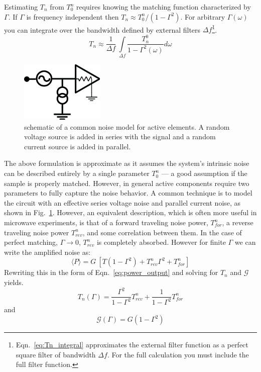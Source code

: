 Estimating $T_n$ from $T_0^n$ requires knowing the matching function characterized by $\Gamma$. If $\Gamma$ is frequency independent then $T_n \approx T_0^n / (1-\Gamma^2)$. For arbitrary $\Gamma(\omega)$ you can integrate over the bandwidth defined by external filters $\Delta f$\footnote{Eqn.~\ref{eq:Tn_integral} approximates the external filter function as a perfect square filter of bandwidth $\Delta f$. For the full calculation you must include the full filter function.}.
\begin{equation}\label{eq:Tn_integral}
T_n \approx \frac{1}{\Delta f}\ \int\limits_{\Delta f}\frac{T_n^0}{1-\Gamma^2(\omega)}d\omega
\end{equation}
\begin{figure}
\centering
\includegraphics[width=40mm]{figures/Johnson_noise_thermometry/schematic_noise_IV.png}
\caption{schematic of a common noise model for active elements. A random voltage source is added in series with the signal and a random current source is added in parallel.}
\label{fig:schematic_noise_IV}
\end{figure}

The above formulation is approximate as it assumes the system's intrinsic noise can be described entirely by a single parameter $T_0^n$ --- a good assumption if the sample is properly matched. However, in general active components require two parameters to fully capture the noise behavior. A common technique is to model the circuit with an effective series voltage noise and parallel current noise, as shown in Fig.~\ref{fig:schematic_noise_IV}. However, an equivalent description, which is often more useful in microwave experiments, is that of a forward traveling noise power, $T_{for}^n$, a reverse traveling noise power $T_{rev}^n$, and some correlation between them. In the case of perfect matching, $\Gamma\rightarrow0$, $T_{rev}^n$ is completely absorbed. However for finite $\Gamma$ we can write the amplified noise as:
\begin{equation}\label{eq:P_full}
\langle P\rangle=G\ \left[T(1-\Gamma^2)+T_{rev}^n\Gamma^2+T_{for}^n\right]
\end{equation}
Rewriting this in the form of Eqn.~\ref{eq:power_output} and solving for $T_n$ and $\mathcal{G}$ yields.
\begin{equation}\label{eq:Tn_effective_full}
T_n(\Gamma)=\frac{\Gamma^2}{1-\Gamma^2}T_{rev}^n+\frac{1}{1-\Gamma^2}T_{for}^n
\end{equation}
and
\begin{equation}\label{eq:G_effective_full}
\mathcal{G}(\Gamma)=G(1-\Gamma^2)
\end{equation}

